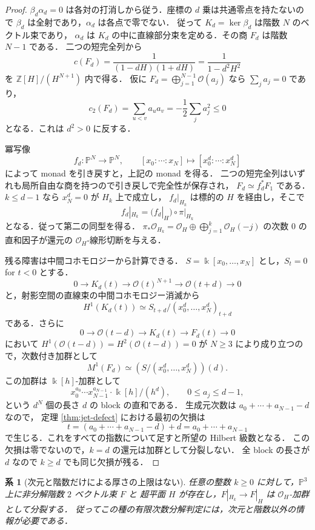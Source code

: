 \documentclass[a4paper,11pt]{ltjsarticle}
\numberwithin{equation}{section}
\theoremstyle{plain}
\newtheorem{corollary}[theorem]{系}
\theoremstyle{definition}
\theoremstyle{remark}
\begin{document}
\begin{proof}
$\beta_d\alpha_d=0$ は各対の打消しから従う．座標の $d$ 乗は共通零点を持たないので
$\beta_d$ は全射であり，$\alpha_d$ は各点で零でない．
従って $K_d=\ker\beta_d$ は階数 $N$ のベクトル束であり，
$\alpha_d$ は $K_d$ の中に直線部分束を定める．その商 $F_d$ は階数 $N-1$ である．
二つの短完全列から
\[
 c(F_d)=\frac1{(1-dH)(1+dH)}=\frac1{1-d^2H^2}
\]
を $\mathbb Z[H]/(H^{N+1})$ 内で得る．
仮に $F_d=\bigoplus_{j=1}^{N-1}\mathcal O(a_j)$ なら
$\sum_j a_j=0$ であり，
\[
 c_2(F_d)=\sum_{u<v}a_ua_v=-\frac12\sum_j a_j^2\leq0
\]
となる．これは $d^2>0$ に反する．

冪写像
\[
 f_d:\mathbb P^N\longrightarrow\mathbb P^N,
 \qquad[x_0:\cdots:x_N]\longmapsto[x_0^d:\cdots:x_N^d]
\]
によって monad を引き戻すと，上記の monad を得る．
二つの短完全列はいずれも局所自由な商を持つので引き戻しで完全性が保存され，
$F_d\simeq f_d^*F_1$ である．$k\leq d-1$ なら $x_N^d=0$ が $H_k$ 上で成立し，
$f_d|_{H_k}$ は標的の $H$ を経由し，そこで
\[
 f_d|_{H_k}=(f_d|_H)\circ\pi|_{H_k}
\]
となる．従って第二の同型を得る．
$\pi_*\mathcal O_{H_k}=\mathcal O_H\oplus\bigoplus_{j=1}^k\mathcal O_H(-j)$
の次数 $0$ の直和因子が還元の $\mathcal O_H$-線形切断を与える．

残る障害は中間コホモロジーから計算できる．
$S=\Bbbk[x_0,\ldots,x_N]$ とし，$S_t=0$ for $t<0$ とする．
\[
 0\longrightarrow K_d(t)\longrightarrow\mathcal O(t)^{N+1}
 \longrightarrow\mathcal O(t+d)\longrightarrow0
\]
と，射影空間の直線束の中間コホモロジー消滅から
\[
 H^1(K_d(t))\simeq
 S_{t+d}/(x_0^d,\ldots,x_N^d)_{t+d}
\]
である．さらに
\[
 0\longrightarrow\mathcal O(t-d)\longrightarrow K_d(t)
 \longrightarrow F_d(t)\longrightarrow0
\]
において $H^1(\mathcal O(t-d))=H^2(\mathcal O(t-d))=0$ が
$N\geq3$ により成り立つので，次数付き加群として
\[
 M^1(F_d)\simeq
 \left(S/(x_0^d,\ldots,x_N^d)\right)(d).
\]
この加群は $\Bbbk[h]$-加群として
\[
 x_0^{a_0}\cdots x_{N-1}^{a_{N-1}}
 \cdot\Bbbk[h]/(h^d),\qquad0\leq a_j\leq d-1,
\]
という $d^N$ 個の長さ $d$ の block の直和である．
生成元次数は $a_0+\cdots+a_{N-1}-d$ なので，
定理 \ref{thm:jet-defect} における最初の欠損は
\[
 t=(a_0+\cdots+a_{N-1}-d)+d=a_0+\cdots+a_{N-1}
\]
で生じる．これをすべての指数について足すと所望の Hilbert 級数となる．
この欠損は零でないので，$k=d$ の還元は加群として分裂しない．
全 block の長さが $d$ なので $k\geq d$ でも同じ欠損が残る．
\end{proof}

\begin{corollary}[次元と階数だけによる厚さの上限はない]\label{cor:no-uniform-jet}
任意の整数 $k\geq0$ に対して，$\mathbb P^3$ 上に非分解階数 $2$ ベクトル束 $F$ と
超平面 $H$ が存在し，$F|_{H_k}\to F|_H$ は $\mathcal O_H$-加群として分裂する．
従ってこの種の有限次数分解判定には，次元と階数以外の情報が必要である．
\end{corollary}
\end{document}
